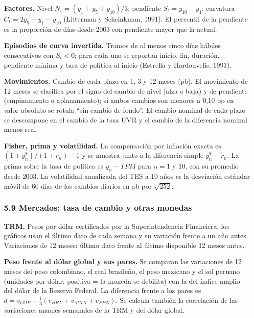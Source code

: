 \textbf{Factores.} Nivel \(N_t=(y_1+y_5+y_{10})/3\); pendiente
\(S_t=y_{10}-y_1\); curvatura \(C_t=2y_5-y_1-y_{10}\) (Litterman y
Scheinkman, 1991). El percentil de la pendiente es la proporción de días
desde 2003 con pendiente mayor que la actual.

\textbf{Episodios de curva invertida.} Tramos de al menos cinco días
hábiles consecutivos con \(S_t<0\); para cada uno se reportan inicio,
fin, duración, pendiente mínima y tasa de política al inicio (Estrella y
Hardouvelis, 1991).

\textbf{Movimientos.} Cambio de cada plazo en 1, 3 y 12 meses (pb). El
movimiento de 12 meses se clasifica por el signo del cambio de nivel
(alza o baja) y de pendiente (empinamiento o aplanamiento); si ambos
cambios son menores a 0,10 pp en valor absoluto se rotula ``sin cambio
de fondo''. El cambio nominal de cada plazo se descompone en el cambio
de la tasa UVR y el cambio de la diferencia nominal menos real.

\textbf{Fisher, prima y volatilidad.} La compensación por inflación
exacta es \((1+y^{\$}_n)/(1+r_n)-1\) y se muestra junto a la diferencia
simple \(y^{\$}_n-r_n\). La prima sobre la tasa de política es
\(y_n-TPM\) para \(n=1\) y 10, con su promedio desde 2003. La
volatilidad anualizada del TES a 10 años es la desviación estándar móvil
de 60 días de los cambios diarios en pb por \(\sqrt{252}\).

\hypertarget{mercados-tasa-de-cambio-y-otras-monedas}{%
\subsubsection{5.9 Mercados: tasa de cambio y otras
monedas}\label{mercados-tasa-de-cambio-y-otras-monedas}}

\textbf{TRM.} Pesos por dólar certificados por la Superintendencia
Financiera; los gráficos usan el último dato de cada semana y su
variación frente a un año antes. Variaciones de 12 meses: último dato
frente al último disponible 12 meses antes.

\textbf{Peso frente al dólar global y sus pares.} Se comparan las
variaciones de 12 meses del peso colombiano, el real brasileño, el peso
mexicano y el sol peruano (unidades por dólar; positivo = la moneda se
debilita) con la del índice amplio del dólar de la Reserva Federal. La
diferencia frente a los pares es
\(d=v_{COP}-\tfrac13(v_{BRL}+v_{MXN}+v_{PEN})\). Se calcula también la
correlación de las variaciones anuales semanales de la TRM y del dólar
global.


